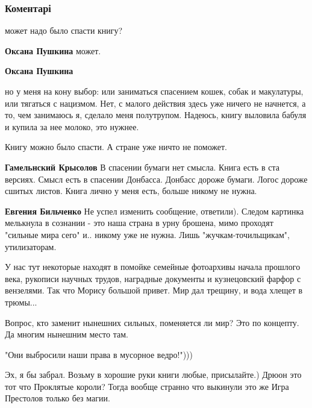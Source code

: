  
 
 
 
 
\subsubsection{Коментарі}

\begin{itemize} %
может надо было спасти книгу?

\begin{itemize} %
\textbf{Оксана Пушкина} может.

\textbf{Оксана Пушкина} 

но у меня на кону выбор: или заниматься спасением кошек, собак и макулатуры,
или тягаться с нацизмом. Нет, с малого действия здесь уже ничего не начнется, а
то, чем занимаюсь я, сделало меня полутрупом. Надеюсь, книгу выловила бабуля и
купила за нее молоко, это нужнее.

\end{itemize} %

Книгу можно было спасти. А стране уже ничто не поможет.

\begin{itemize} %
\textbf{Гамельнский Крысолов} В спасении бумаги нет смысла. Книга есть в ста версиях. Смысл есть в спасении Донбасса. Донбасс дороже бумаги. Логос дороже сшитых листов. Книга лично у меня есть, больше никому не нужна.

\textbf{Евгения Бильченко} Не успел изменить сообщение, ответили).
Следом картинка мелькнула в сознании - это наша страна в урну брошена, мимо проходят "сильные мира сего" и.. никому уже не нужна. Лишь "жучкам-точильщикам", утилизаторам.
\end{itemize} %


У нас тут некоторые находят в помойке семейные фотоархивы начала прошлого века,
рукописи научных трудов, наградные документы и кузнецовский фарфор с вензелями.
Так что Морису большой привет. Мир дал трещину, и вода хлещет в трюмы...


Вопрос, кто заменит нынешних сильных, поменяется ли мир? Это по концепту. Да
многим нынешним место там.


"Они выбросили наши права в мусорное ведро!")))


Эх, я бы забрал. Возьму в хорошие руки книги любые, присылайте.) Дрюон это тот
что Проклятые короли? Тогда вообще странно что выкинули это же Игра Престолов
только без магии.


\end{itemize} %

